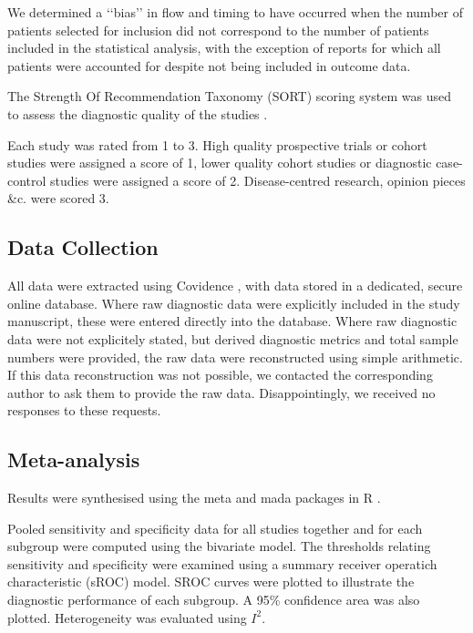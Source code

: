 We determined a ‘‘bias’’ in flow and timing to have occurred when the number of patients selected for inclusion did not correspond to the number of patients included in the statistical analysis, with the exception of reports for which all patients were accounted for despite not being included in outcome data. 


The Strength Of Recommendation Taxonomy (SORT) scoring system was used to assess the diagnostic quality of the studies \cite{ebellStrengthRecommendationTaxonomy2004}.

Each study was rated from 1 to 3. High quality prospective trials or cohort studies were assigned a score of 1, lower quality cohort studies or diagnostic case-control studies were assigned a score of 2. Disease-centred research, opinion pieces \&c. were scored 3.

\subsection{Data Collection}

All data were extracted using Covidence \cite{Covidence}, with data stored in a dedicated, secure online database.
Where raw diagnostic data were explicitly included in the study manuscript, these were entered directly into the database.
Where raw diagnostic data were not explicitely stated, but derived diagnostic metrics and total sample numbers were provided, the raw data were reconstructed using simple arithmetic.
If this data reconstruction was not possible, we contacted the corresponding author to ask them to provide the raw data. 
Disappointingly, we received no responses to these requests.




\subsection{Meta-analysis}

Results were synthesised using the meta \cite{balduzziHowPerformMetaanalysis2019} and mada \cite{doeblerMadaMetaAnalysisDiagnostic2020} packages in R \cite{r-core}. 

Pooled sensitivity and specificity data for all studies together and for each subgroup were computed using the bivariate model.
The thresholds relating sensitivity and specificity were examined using a summary receiver operatich characteristic (sROC) model.
SROC curves were plotted to illustrate the diagnostic performance of each subgroup.
A 95\% confidence area was also plotted.
Heterogeneity was evaluated using $I^2$.
